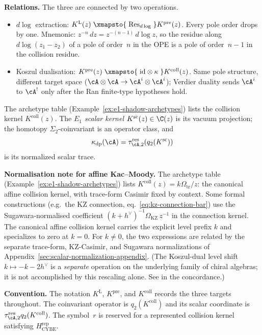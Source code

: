 \begin{remark}
\medskip
\noindent\textbf{Relations.}
The three are connected by two operations.
\begin{itemize}
\item $d\log$ extraction:
 $K^{\mathrm{L}}(z) \;\xmapsto{\;\operatorname{Res}_{d\log}\;}
 K^{\mathrm{pre}}(z)$.
 Every pole order drops by one.
 Mnemonic: $z^{-n}\,dz = z^{-(n-1)}\,d\log z$,
 so the residue along $d\log(z_1-z_2)$ of a pole of order~$n$
 in the OPE is a pole of order~$n-1$ in the collision residue.
\item Koszul dualisation:
 $K^{\mathrm{pre}}(z) \;\xmapsto{\;\mathrm{id}\otimes\kappa\;}
 K^{\mathrm{coll}}(z)$.
 Same pole structure, different target space
 ($\cA\otimes\cA \to \cA^i\otimes\cA^i$); Verdier duality sends
 $\cA^i$ to $\cA^!$ only after the Ran finite-type hypotheses hold.
\end{itemize}
The archetype table
\textup{(}Example~\textup{\ref{ex:e1-shadow-archetypes})} lists the
collision kernel $K^{\mathrm{coll}}(z)$. The \emph{$E_1$ scalar kernel}
$K^{\mathrm{sc}}(z) \in \C(z)$ is its vacuum projection; the
homotopy $\Sigma_2$-coinvariant is an operator class, and
\[
 \kappa_{\mathrm{dp}}(\cA)
 =\tau_{\cA,2}^{\mathrm{res}}\!\left(q_2(K^{\mathrm{sc}})\right)
\]
is its normalized scalar trace.

\medskip
\noindent\textbf{Normalisation note for affine Kac--Moody.}
The archetype table
\textup{(}Example~\textup{\ref{ex:e1-shadow-archetypes})}
lists \(K^{\mathrm{coll}}(z)=k\Omega_{\mathrm{tr}}/z\): the
canonical affine collision kernel, with trace-form Casimir fixed by
context. Some formal constructions
\textup{(}e.g.\ the KZ connection,
eq.~\textup{\eqref{eq:kz-connection-bar})} use the
Sugawara-normalised coefficient
$(k{+}h^\vee)^{-1}\Omega_{\mathrm{KZ}}\, z^{-1}$ in the
connection kernel.  The canonical affine collision kernel carries the
explicit level prefix $k$ and
specializes to zero at $k=0$. For $k \neq 0$, the two expressions are related
by the separate trace-form, KZ-Casimir, and Sugawara normalizations
of Appendix~\ref{sec:scalar-normalization-appendix}.
(The Koszul-dual level shift $k \mapsto -k - 2h^\vee$ is a
\emph{separate} operation on the underlying family of chiral
algebras; it is not accomplished by this rescaling alone.
See in the concordance.)

\medskip
\noindent\textbf{Convention.}
The notation $K^{\mathrm{L}}$, $K^{\mathrm{pre}}$, and
$K^{\mathrm{coll}}$ records the three targets throughout.  The
coinvariant operator is $q_2(K^{\mathrm{coll}})$ and its scalar
coordinate is
$\tau_{\cA,2}^{\mathrm{res}}q_2(K^{\mathrm{coll}})$.  The symbol~$r$
is reserved for a represented collision kernel satisfying
$H_{\mathrm{CYBE}}^{\mathrm{rep}}$.
\end{remark}

